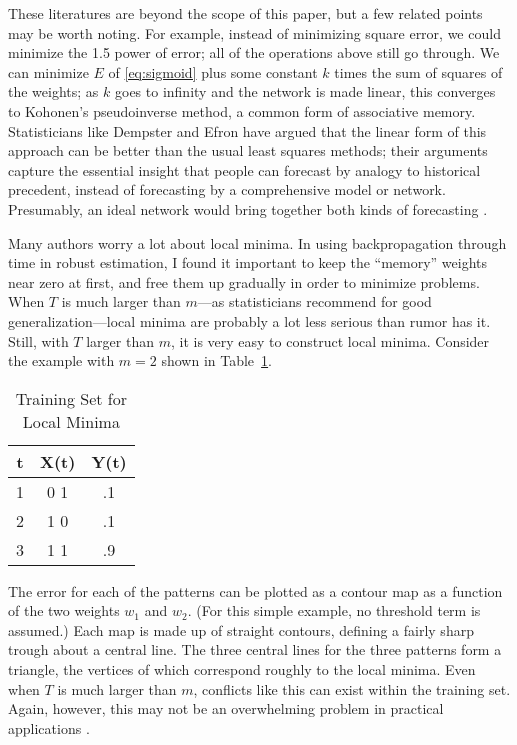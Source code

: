 \documentclass[journal]{IEEEtran} %
\begin{document}
These literatures are beyond the scope of this paper, but a few related points may be worth noting. For example, instead of minimizing square error, we could minimize the 1.5 power of error; all of the operations above still go through. We can minimize $E$ of \eqref{eq:sigmoid} plus some constant $k$ times the sum of squares of the weights; as $k$ goes to infinity and the network is made linear, this converges to Kohonen's pseudoinverse method, a common form of associative memory. Statisticians like Dempster and Efron have argued that the linear form of this approach can be better than the usual least squares methods; their arguments capture the essential insight that people can forecast by analogy to historical precedent, instead of forecasting by a comprehensive model or network. Presumably, an ideal network would bring together both kinds of forecasting \cite{Werbos:1988, Werbos:1987c}.

Many authors worry a lot about local minima. In using backpropagation through time in robust estimation, I found it important to keep the ``memory'' weights near zero at first, and free them up gradually in order to minimize problems. When $T$ is much larger than $m$---as statisticians recommend for good generalization---local minima are probably a lot less serious than rumor has it. Still, with $T$ larger than $m$, it is very easy to construct local minima. Consider the example with $m = 2$ shown in Table~\ref{tab:training_set}.

\begin{table}[htb]
    \centering
    \caption{Training Set for Local Minima}
    \label{tab:training_set}
    \begin{tabular}{|c|c|c|}
        \hline
        \textbf{t} & \textbf{X(t)} & \textbf{Y(t)} \\
        \hline
        1 & 0 1 & .1 \\
        2 & 1 0 & .1 \\
        3 & 1 1 & .9 \\
        \hline
    \end{tabular}
\end{table}

The error for each of the patterns can be plotted as a contour map as a function of the two weights $w_1$ and $w_2$. (For this simple example, no threshold term is assumed.) Each map is made up of straight contours, defining a fairly sharp trough about a central line. The three central lines for the three patterns form a triangle, the vertices of which correspond roughly to the local minima. Even when $T$ is much larger than $m$, conflicts like this can exist within the training set. Again, however, this may not be an overwhelming problem in practical applications \cite{Williams:1990}.
\end{document}
